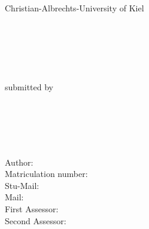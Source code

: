 \begin{titlepage}
    \enlargethispage{3cm}
    \voffset-40mm
    \begin{center}
        {\normalsize Christian-Albrechts-University of Kiel} \\%
        {\normalsize \chair} \\%
        {\normalsize \institute} \\%
        {\normalsize \faculty} \\%
    \end{center}
    \vspace*{0.3in}
    \begin{center}
        \vspace*{0.9in}
        \makeatletter
        {\Large \textbf{\@title}} \\[0.5in]
        {\textbf{\typedocument}} \\[0.2in]
        {\normalsize submitted by} \\[0.2in]
        \small{\thesisauthor} \\[0.1in]
        {\fontsize{14}{16}\selectfont \submissiondateCover} \\%
    \end{center}
    \vspace*{0.3in}
    \begin{center}
        {\small \maybehref{\thesislicenseURL}{\thesislicenseText}}\\[0.03in]
        {\small \maybehref{\thesisgiturl}{\thesisgitlabel}}\\[0.1in]
    \end{center}
    \vfill
    \begin{flushleft}
        \small{Author: \thesisauthor} \\%
        \small{Matriculation number: \stunumber} \\%
        \small{Stu-Mail: \stuemail} \\%
        \small{Mail: \privatemail} \\%
        \vspace*{0.2in}
        \small{First Assessor: \firstsupervisorname} \\%
        \small{Second Assessor: \secondsupervisorname} \\%
    \end{flushleft}
\end{titlepage}